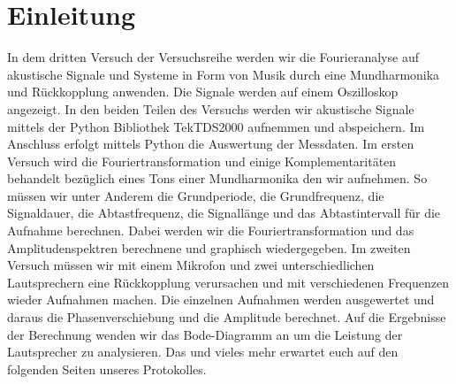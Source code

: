 \documentclass[12pt, oneside, a4paper, \docLanguage]{report}
\begin{document}

\setcounter{section}{0}



\clearpage

%
%


%
%


%
%


%
%




\setcounter{page}{1} 
\pagestyle{default}
%
%
\chapter{Einleitung}
\label{chap:EINL}
In dem dritten Versuch der Versuchsreihe werden wir die Fourieranalyse auf akustische Signale und Systeme in Form von Musik durch eine Mundharmonika und Rückkopplung anwenden. Die Signale werden auf einem Oszilloskop angezeigt.
\newline
In den beiden Teilen des Versuchs werden wir akustische Signale mittels der Python Bibliothek TekTDS2000 aufnemmen und abspeichern. Im Anschluss erfolgt mittels Python die Auswertung der Messdaten. 
\newline 
Im ersten Versuch wird die Fouriertransformation und einige Komplementaritäten behandelt bezüglich eines Tons einer Mundharmonika den wir aufnehmen.
So müssen wir unter Anderem die Grundperiode, die Grundfrequenz, die Signaldauer, die Abtastfrequenz, die Signallänge und das Abtastintervall für die Aufnahme berechnen.
\newline 
Dabei werden wir die Fouriertransformation und das Amplitudenspektren berechnene und graphisch wiedergegeben.
Im zweiten Versuch müssen wir mit einem Mikrofon und zwei unterschiedlichen Lautsprechern eine Rückkopplung verursachen und mit verschiedenen Frequenzen wieder Aufnahmen machen.
\newline 
Die einzelnen Aufnahmen werden ausgewertet und daraus die Phasenverschiebung und die Amplitude berechnet.
Auf die Ergebnisse der Berechnung wenden wir das Bode-Diagramm an um die Leistung der Lautsprecher zu analysieren.
\newline 
Das und vieles mehr erwartet euch auf den folgenden Seiten unseres Protokolles.
%
%
\end{document}
